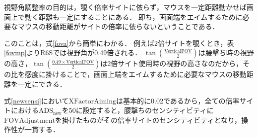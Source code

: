 \documentclass[uplatex, dvipdfmx, ja=standard, a4paper]{bxjsarticle}
\begin{document}
視野角調整率の目的は，覗く倍率サイトに依らず，マウスを一定距離動かせば画面上で動く距離も一定にすることにある．
即ち，画面端をエイムするために必要なマウスの移動距離がサイトの倍率に依らないということである．

このことは，式\eqref{fova}から簡単にわかる．
例えば2倍サイトを覗くとき，表\ref{fovmp}よりR6Sでは視野角が\(0.49\)倍される．
\(\tan \left(\frac{\mathrm{VerticalFOV}}{2}\right)\)は腰撃ち時の視野の高さ，\(\tan \left(\frac{0.49 \times \mathrm{VerticalFOV}}{2}\right)\)は2倍サイト使用時の視野の高さなのだから，その比を感度に掛けることで，画面上端をエイムするために必要なマウスの移動距離を一定にできる．

式\eqref{newsensi}において\(\mathrm{XFactorAiming}\)は基本的に\(0.02\)であるから，全ての倍率サイトにおける\(\mathrm{ADS}_{\mathrm{new}}\)を\(50\)に設定すると，腰撃ちのセンシティビティに\(\mathrm{FOVAdjustment}\)を掛けたものがその倍率サイトのセンシティビティとなり，操作性が一貫する．
\end{document}
